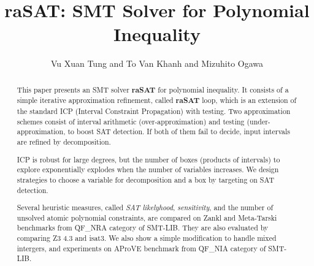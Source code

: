 \documentclass[runningheads,a4paper,oribibl]{llncs}
\begin{document}
%
\title{{\bf raSAT}: SMT Solver for Polynomial Inequality}

\author{Vu Xuan Tung and To Van Khanh and Mizuhito Ogawa} 


\maketitle

\begin{abstract}
This paper presents an SMT solver {\bf raSAT} for polynomial inequality. 
It consists of a simple iterative approximation refinement, called {\bf raSAT} loop, 
which is an extension of the standard ICP (Interval Constraint Propagation) with testing. 
Two approximation schemes consist of interval arithmetic (over-approximation) and 
testing (under-approximation, to boost SAT detection. 
If both of them fail to decide, input intervals are refined by decomposition. 

ICP is robust for large degrees, but the number of boxes (products of intervals) to explore 
exponentially explodes when the number of variables increases. 
We design strategies to choose a variable for decomposition and a box by 
targeting on SAT detection. 

Several heuristic measures, called {\em SAT likelyhood}, {\em sensitivity}, and the number of 
unsolved atomic polynomial constraints, are compared on Zankl and Meta-Tarski benchmarks from 
QF\_NRA category of SMT-LIB. They are also evaluated by comparing Z3 4.3 and isat3. 
We also show a simple modification to handle mixed intergers, and experiments on 
AProVE benchmark from QF\_NIA category of SMT-LIB. 
\end{abstract}



%
\end{document}
